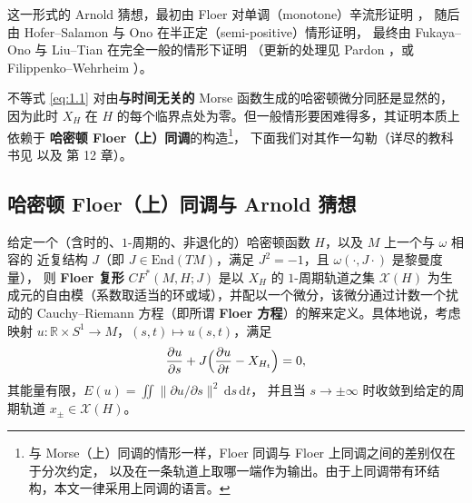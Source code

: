 \documentclass[UTF8,a4paper,11pt,fontset=windows]{ctexart}
\theoremstyle{cnthm}
\numberwithin{equation}{section}
\newcommand{\R}{\mathbb{R}}
\newcommand{\CF}{CF}                  %
\begin{document}
这一形式的 Arnold 猜想，最初由 Floer 对单调（monotone）辛流形证明 \cite{r39,r40}，
随后由 Hofer--Salamon \cite{r64} 与 Ono \cite{r80} 在半正定（semi-positive）情形证明，
最终由 Fukaya--Ono \cite{r46} 与 Liu--Tian \cite{r71} 在完全一般的情形下证明
（更新的处理见 Pardon \cite{r82}，或 Filippenko--Wehrheim \cite{r38}）。

不等式 \eqref{eq:1.1} 对由\textbf{与时间无关的} Morse 函数生成的哈密顿微分同胚是显然的，
因为此时 $X_H$ 在 $H$ 的每个临界点处为零。但一般情形要困难得多，其证明本质上依赖于
\textbf{哈密顿 Floer（上）同调}的构造\footnote{%
与 Morse（上）同调的情形一样，Floer 同调与 Floer 上同调之间的差别仅在于分次约定，
以及在一条轨道上取哪一端作为输出。由于上同调带有环结构，本文一律采用上同调的语言。}，
下面我们对其作一勾勒（详尽的教科书见 \cite{r18} 以及 \cite{r72} 第 12 章）。

\subsection{哈密顿 Floer（上）同调与 Arnold 猜想}

给定一个（含时的、$1$-周期的、非退化的）哈密顿函数 $H$，以及 $M$ 上一个与 $\omega$ 相容的
近复结构 $J$（即 $J\in\mathrm{End}(TM)$，满足 $J^{2}=-1$，且 $\omega(\cdot,J\cdot)$ 是黎曼度量），
则 \textbf{Floer 复形} $\CF^{*}(M,H;J)$ 是以 $X_H$ 的 $1$-周期轨道之集 $\mathcal{X}(H)$
为生成元的自由模（系数取适当的环或域），并配以一个微分，该微分通过计数一个扰动的
Cauchy--Riemann 方程（即所谓 \textbf{Floer 方程}）的解来定义。具体地说，考虑映射
$u:\R\times S^{1}\to M$，$(s,t)\mapsto u(s,t)$，满足
\begin{equation}\label{eq:1.2}
\frac{\partial u}{\partial s}+J\Bigl(\frac{\partial u}{\partial t}-X_{H_t}\Bigr)=0,
\end{equation}
其能量有限，$E(u)=\iint\|\partial u/\partial s\|^{2}\,\mathrm{d}s\,\mathrm{d}t$，
并且当 $s\to\pm\infty$ 时收敛到给定的周期轨道 $x_{\pm}\in\mathcal{X}(H)$。

\end{document}
